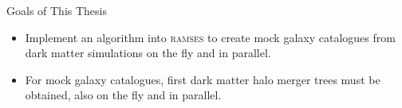 \begin{frame}{Goals of This Thesis}
    \begin{itemize}
        \item Implement an algorithm into \textsc{ramses} \parencite{ramses} to create mock galaxy catalogues from dark matter simulations on the fly and in parallel.
        
        \item For mock galaxy catalogues, first dark matter halo merger trees must be obtained, also on the fly and in parallel.
    \end{itemize}
\end{frame}
